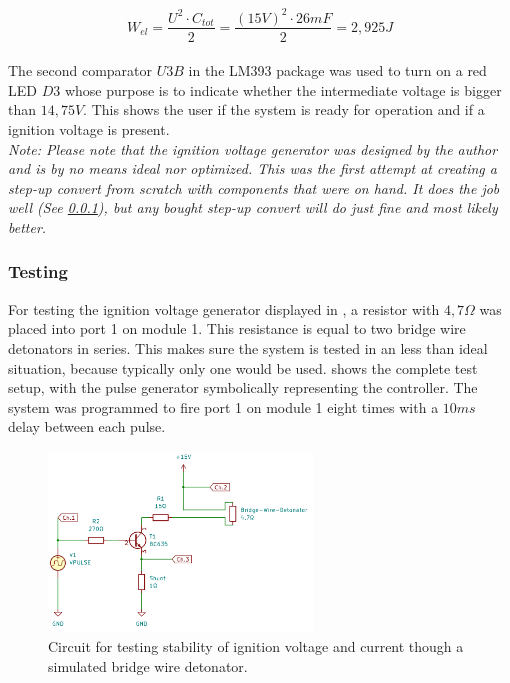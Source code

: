 \begin{equation}
W_{el}=\frac{U^2 \cdot C_{tot}}{2}=\frac{(15V)^2 \cdot 26mF}{2}=2,925J
\label{eq:power_in_system}
\end{equation}\\

\noindent The second comparator $U3B$ in the LM393 package was used to turn on a red LED $D3$ whose purpose is to indicate whether the intermediate voltage is bigger than $14,75V$. This shows the user if the system is ready for operation and if a ignition voltage is present.\\


\noindent \small{\textit{Note: Please note that the ignition voltage generator was designed by the author and is by no means ideal nor optimized. This was the first attempt at creating a step-up convert from scratch with components that were on hand. It does the job well (See \cref{Testing}), but any bought step-up convert will do just fine and most likely better.}}\\

\pagebreak

\subsubsection{Testing}
\label{Testing}
For testing the ignition voltage generator displayed in , a resistor with $4,7\Omega$ was placed into port 1 on module 1. This resistance is equal to two bridge wire detonators in series. This makes sure the system is tested in an less than ideal situation, because typically only one would be used.  shows the complete test setup, with the pulse generator symbolically representing the controller. The system was programmed to fire port 1 on module 1 eight times with a $10ms$ delay between each pulse.

\begin{figure}[!ht]
    \centering
    \includegraphics[width=7cm]{./Figures/testrig_pulse.png}
    \caption{Circuit for testing stability of ignition voltage and current though a simulated bridge wire detonator.}
    \label{fig:testrig_pulse}     
\end{figure}

